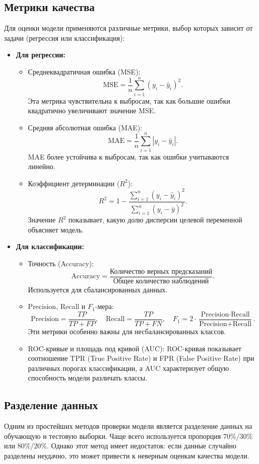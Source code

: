 \subsection*{Метрики качества}
Для оценки модели применяются различные метрики, выбор которых зависит от задачи (регрессия или классификация):
\begin{itemize}
    \item \textbf{Для регрессии:}
    \begin{itemize}
        \item Среднеквадратичная ошибка (MSE):
        \[
        \text{MSE} = \frac{1}{n} \sum_{i=1}^n (y_i - \hat{y}_i)^2.
        \]
        Эта метрика чувствительна к выбросам, так как большие ошибки квадратично увеличивают значение MSE.
        \item Средняя абсолютная ошибка (MAE):
        \[
        \text{MAE} = \frac{1}{n} \sum_{i=1}^n |y_i - \hat{y}_i|.
        \]
        MAE более устойчива к выбросам, так как ошибки учитываются линейно.
        \item Коэффициент детерминации ($R^2$):
        \[
        R^2 = 1 - \frac{\sum_{i=1}^n (y_i - \hat{y}_i)^2}{\sum_{i=1}^n (y_i - \bar{y})^2}.
        \]
        Значение $R^2$ показывает, какую долю дисперсии целевой переменной объясняет модель.
    \end{itemize}
    \item \textbf{Для классификации:}
    \begin{itemize}
        \item Точность (Accuracy):
        \[
        \text{Accuracy} = \frac{\text{Количество верных предсказаний}}{\text{Общее количество наблюдений}}.
        \]
        Используется для сбалансированных данных.
        \item Precision, Recall и $F_1$-мера:
        \[
        \text{Precision} = \frac{TP}{TP + FP}, \quad \text{Recall} = \frac{TP}{TP + FN}, \quad F_1 = 2 \cdot \frac{\text{Precision} \cdot \text{Recall}}{\text{Precision} + \text{Recall}}.
        \]
        Эти метрики особенно важны для несбалансированных классов.
        \item ROC-кривые и площадь под кривой (AUC):
        ROC-кривая показывает соотношение TPR (True Positive Rate) и FPR (False Positive Rate) при различных порогах классификации, а AUC характеризует общую способность модели различать классы.
    \end{itemize}
\end{itemize}

\subsection*{Разделение данных}
Одним из простейших методов проверки модели является разделение данных на обучающую и тестовую выборки. Чаще всего используется пропорция 70\%/30\% или 80\%/20\%. Однако этот метод имеет недостаток: если данные случайно разделены неудачно, это может привести к неверным оценкам качества модели.

